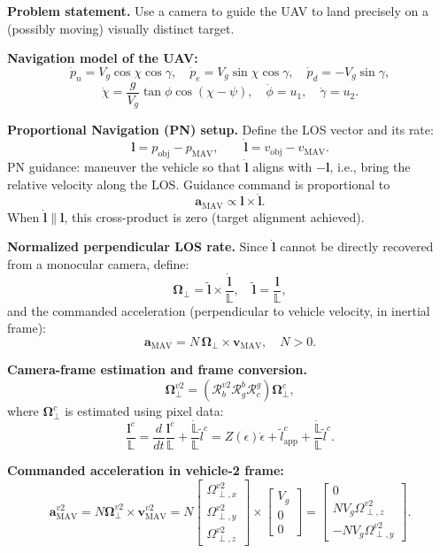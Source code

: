 \documentclass[11pt,a4paper]{article}
\newcommand{\vect}[1]{\bm{#1}}
\begin{document}
\textbf{Problem statement.}
Use a camera to guide the UAV to land precisely on a (possibly moving) visually distinct target.

\textbf{Navigation model of the UAV:}
\[
\dot p_n = V_g\cos\chi\cos\gamma,\quad
\dot p_e = V_g\sin\chi\cos\gamma,\quad
\dot p_d = -V_g\sin\gamma,
\]
\[
\dot\chi = \frac{g}{V_g}\tan\phi\cos(\chi-\psi),\quad
\dot\phi = u_1,\quad
\dot\gamma = u_2.
\]

\textbf{Proportional Navigation (PN) setup.}
Define the LOS vector and its rate:
\[
\vect{l} = p_{\mathrm{obj}} - p_{\mathrm{MAV}},
\qquad
\dot{\vect{l}} = v_{\mathrm{obj}} - v_{\mathrm{MAV}}.
\]
PN guidance: maneuver the vehicle so that $\dot{\vect{l}}$ aligns with $-\vect{l}$, i.e., bring the relative velocity along the LOS. Guidance command is proportional to
\[
\vect{a}_{\mathrm{MAV}} \propto \vect{l}\times\dot{\vect{l}}.
\]
When $\dot{\vect{l}}\parallel\vect{l}$, this cross-product is zero (target alignment achieved).

\textbf{Normalized perpendicular LOS rate.}
Since $\dot{\vect{l}}$ cannot be directly recovered from a monocular camera, define:
\[
\vect{\Omega}_\perp = \tilde{\vect{l}} \times \frac{\dot{\vect{l}}}{\mathbb{L}},
\quad \tilde{\vect{l}} = \frac{\vect{l}}{\mathbb{L}},
\]
and the commanded acceleration (perpendicular to vehicle velocity, in inertial frame):
\[
\boxed{
\vect{a}_{\mathrm{MAV}} = N\,\vect{\Omega}_\perp \times \vect{v}_{\mathrm{MAV}},\quad N>0.
}
\]

\textbf{Camera-frame estimation and frame conversion.}
\[
\vect{\Omega}_\perp^{v2} = \left(\mathcal{R}_b^{v2}\mathcal{R}_g^b\mathcal{R}_c^g\right)\vect{\Omega}_\perp^c,
\]
where $\vect{\Omega}_\perp^c$ is estimated using pixel data:
\[
\frac{\vect{l}^c}{\mathbb{L}} = \frac{d}{dt}\frac{\vect{l}^c}{\mathbb{L}} + \frac{\dot{\mathbb{L}}}{\mathbb{L}}\tilde{l}^c
= Z(\epsilon)\dot\epsilon + \tilde{l}^c_{\mathrm{app}} + \frac{\dot{\mathbb{L}}}{\mathbb{L}}\tilde{l}^c.
\]

\textbf{Commanded acceleration in vehicle-2 frame:}
\[
\vect{a}_{\mathrm{MAV}}^{v2}
= N\vect{\Omega}_\perp^{v2}\times\vect{v}_{\mathrm{MAV}}^{v2}
= N\begin{bmatrix}\Omega^{v2}_{\perp,x}\\\Omega^{v2}_{\perp,y}\\\Omega^{v2}_{\perp,z}\end{bmatrix}
\times\begin{bmatrix}V_g\\0\\0\end{bmatrix}
=\begin{bmatrix}0\\NV_g\Omega^{v2}_{\perp,z}\\-NV_g\Omega^{v2}_{\perp,y}\end{bmatrix}.
\]
\end{document}
